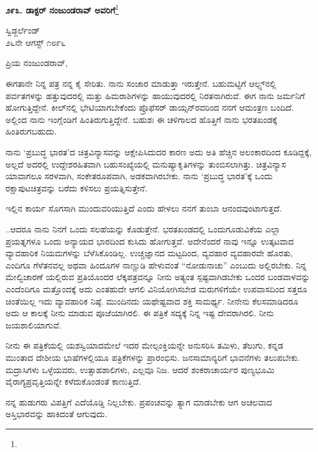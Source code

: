 \begin{center}
\textbf{೨೯೩. ಡಾಕ್ಟರ್ ನಂಜುಂಡರಾವ್ ಅವರಿಗೆ}\footnote{}
\end{center}

\begin{flushright}
ಸ್ವಿಡ್ಜರ್ಲೆಂಡ್\\೨೬ನೇ ಆಗಸ್ಟ್ ೧೮೯೬
\end{flushright}

\noindent
ಪ್ರಿಯ ನಂಜುಂಡರಾವ್,

ಈಗತಾನೇ ನಿನ್ನ ಪತ್ರ ನನ್ನ ಕೈ ಸೇರಿತು. ನಾನು ಸಂಚಾರ ಮಾಡುತ್ತಾ ಇರುತ್ತೇನೆ. ಬಹುಮಟ್ಟಿಗೆ ಆಲ್ಪ್ಸ್‌ನಲ್ಲಿ ಪರ್ವತಗಳನ್ನು ಹತ್ತುವುದರಲ್ಲಿ ಮತ್ತು ಹಿಮರಾಶಿಗಳನ್ನು ಹಾಯುವುದರಲ್ಲಿ ನಿರತನಾಗಿರುವೆ. ಈಗ ನಾನು ಜರ್ಮನಿಗೆ ಹೋಗುತ್ತಿದ್ದೇನೆ. ಕೀಲ್‌ನಲ್ಲಿ ಭೇಟಿಯಾಗಬೇಕೆಂದು ಪ್ರೊಫೆಸರ್ ಡಾಯ್ಸನ್‌ರವರಿಂದ ನನಗೆ ಆಮಂತ್ರಣ ಬಂದಿದೆ. ಅಲ್ಲಿಂದ ನಾನು ಇಂಗ್ಲೆಂಡಿಗೆ ಹಿಂತಿರುಗುತ್ತಿದ್ದೇನೆ. ಬಹುಶಃ ಈ ಚಳಿಗಾಲದ ಹೊತ್ತಿಗೆ ನಾನು ಭರತಖಂಡಕ್ಕೆ ಹಿಂತಿರುಗಬಹುದು.

ನಾನು ‘ಪ್ರಬುದ್ಧ ಭಾರತ’ದ ಚಿತ್ರವಿನ್ಯಾಸವನ್ನು ಆಕ್ಷೇಪಿಸಿದುದರ ಕಾರಣ ಅದು ಅತಿ ಹೆಚ್ಚಿನ ಅಲಂಕಾರದಿಂದ ಕೂಡಿದ್ದಕ್ಕೆ, ಅಲ್ಲದೆ ಅದರಲ್ಲಿ ಉದ್ದೇಶರಹಿತವಾಗಿ ಬಹುಸಂಖ್ಯೆಯಲ್ಲಿ ಮನುಷ್ಯಾಕೃತಿಗಳನ್ನು ತುಂಬಿಸಲಾಗಿತ್ತು. ಚಿತ್ರವಿನ್ಯಾಸ ಯಾವಾಗಲೂ ಸರಳವಾಗಿ, ಸಂಕೇತರೂಪವಾಗಿ, ಅಡಕವಾಗಿರಬೇಕು. ನಾನು ‘ಪ್ರಬುದ್ಧ ಭಾರತ’ಕ್ಕೆ ಒಂದು ರಕ್ಷಾಪುಟಚಿತ್ರವನ್ನು ಬರೆದು ಕಳಿಸಲು ಪ್ರಯತ್ನಿಸುತ್ತೇನೆ.

ಇಲ್ಲಿನ ಕಾರ್ಯ ಸೊಗಸಾಗಿ ಮುಂದುವರಿಯುತ್ತಿದೆ ಎಂದು ಹೇಳಲು ನನಗೆ ತುಂಬಾ ಆನಂದವುಂಟಾಗುತ್ತದೆ.

..ಆದರೂ ನಾನು ನಿನಗೆ ಒಂದು ಸಲಹೆಯನ್ನು ಕೊಡುತ್ತೇನೆ. ಭರತಖಂಡದಲ್ಲಿ ಒಂದುಗೂಡುವಿಕೆಯ ಎಲ್ಲಾ ಪ್ರಯತ್ನಗಳೂ ಒಂದು ಅನ್ಯಾಯದ ಭಾರದಿಂದ ಕುಸಿದು ಹೋಗುತ್ತವೆ. ಅದೇನೆಂದರೆ ನಾವು ಇನ್ನೂ ಉತ್ಕಟವಾದ ವ್ಯಾವಹಾರಿಕ ನಿಯಮಗಳನ್ನು ಬೆಳೆಸಿಕೊಂಡಿಲ್ಲ. ಉಚ್ಚಜ್ಞಾನದ ಮಟ್ಟದಿಂದ, ವ್ಯವಹಾರ ವ್ಯವಹಾರವೇ ಹೊರತು, ಎಂದಿಗೂ ಗೆಳೆತನವಲ್ಲ\enginline{-} ಅಥವಾ ಹಿಂದೂಗಳ ನಾಣ್ಣುಡಿ ಹೇಳುವಂತೆ “ನೋಡು\enginline{-}ನಾಚು” ಎಂಬುದು ಅಲ್ಲಿರಬೇಕು. ನಿನ್ನ ಮೇಲ್ವಿಚಾರಣೆ ಯಲ್ಲಿರುವ ಪ್ರತಿಯೊಂದರ ಲೆಕ್ಕಪತ್ರವನ್ನೂ ನೀನು ಅತ್ಯಂತ ಸ್ಪಷ್ಟವಾಗಿಡಬೇಕು\enginline{-} ಒಂದರ ಬಂಡವಾಳವನ್ನು ಎಂದೆಂದಿಗೂ ಮತ್ತೊಂದಕ್ಕೆ ಅದು ಎಂತಹುದೇ ಆಗಲಿ ವಿನಿಯೋಗಿಸಬೇಡ \enginline{-} ಮರುಗಳಿಗೆಯೇ ಉಪವಾಸದಿಂದ ಸತ್ತರೂ ಚಿಂತೆಯಿಲ್ಲ\enginline{-} ಇದು ವ್ಯಾವಹಾರಿಕ ನಿಷ್ಠೆ. ಮುಂದಿನದು ಯಥೇಷ್ಟವಾದ ಶಕ್ತಿ ಸಾಮರ್ಥ್ಯ. ನೀನೇನು ಕೆಲಸಮಾಡಿದರೂ ಅದು ಆ ಕಾಲಕ್ಕೆ ನೀನು ಮಾಡುವ ಪೂಜೆಯಾಗಿರಲಿ. ಈ ಪತ್ರಿಕೆ ಸದ್ಯಕ್ಕೆ ನಿನ್ನ ಇಷ್ಟ ದೇವರಾಗಿರಲಿ. ನೀನು ಜಯಶಾಲಿಯಾಗುವೆ.

ನೀನು ಈ ಪತ್ರಿಕೆಯಲ್ಲಿ ಯಶಸ್ವಿಯಾದಮೇಲೆ ಇದರ ಮೇಲ್ಪಂಕ್ತಿಯನ್ನೇ ಅನುಸರಿಸಿ ತಮಿಳು, ತೆಲುಗು, ಕನ್ನಡ ಮುಂತಾದ ದೇಶೀಯ ಭಾಷೆಗಳಲ್ಲಿಯೂ ಪತ್ರಿಕೆಗಳನ್ನು ಪ್ರಾರಂಭಿಸು. ಜನಸಾಮಾನ್ಯರಿಗೆ ಭಾವನೆಗಳು ತಲುಪಬೇಕು. ಮದ್ರಾಸಿಗಳು ಒಳ್ಳೆಯವರು, ಉತ್ಸಾಹಶಾಲಿಗಳು, ಎಲ್ಲವೂ ನಿಜ. ಆದರೆ ಶಂಕರಾಚಾರ್ಯರ ಪುಣ್ಯಭೂಮಿ ವೈರಾಗ್ಯಪ್ರವೃತ್ತಿಯನ್ನೇ ಕಳೆದುಕೊಂಡಂತೆ ಕಾಣುತ್ತಿದೆ.

ನನ್ನ ಹುಡುಗರು ವಿಪತ್ತಿಗೆ ಎದೆಯೊಡ್ಡಿ ನಿಲ್ಲಬೇಕು. ಪ್ರಪಂಚವನ್ನು ತ್ಯಾಗ ಮಾಡಬೇಕು\enginline{-} ಆಗ ಅಚಲವಾದ ಅಸ್ತಿಭಾರವನ್ನು ಹಾಕಿದಂತೆ ಆಗುವುದು.

